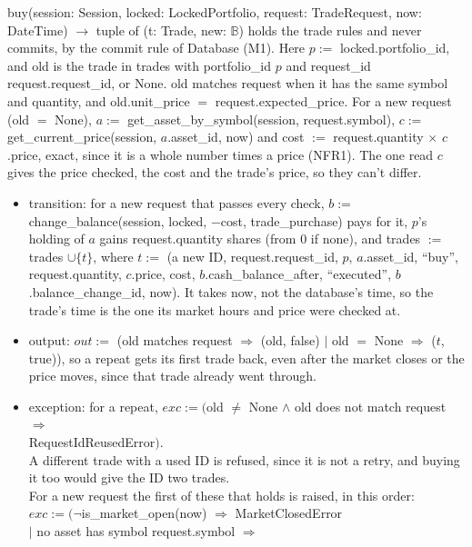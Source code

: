 \documentclass[12pt, titlepage]{article}
\begin{document}
\medskip
\noindent buy(session: Session, locked: LockedPortfolio, request: TradeRequest,
now: DateTime) $\rightarrow$ tuple of (t: Trade, new: $\mathbb{B}$) holds the
trade rules and never commits, by the commit rule of Database (M1). Here
$p :=$ locked.portfolio\_id, and old is the
trade in trades with portfolio\_id $p$ and request\_id request.request\_id, or
None. old matches request when it has the same symbol and quantity, and
old.unit\_price $=$ request.expected\_price. For a new request (old $=$ None),
$a :=$ get\_asset\_by\_symbol(session, request.symbol), $c :=$
get\_current\_price(session, $a$.asset\_id, now) and cost $:=$
request.quantity $\times$ $c$.price, exact, since it is a whole number times a
price (NFR1). The one read $c$ gives the price checked, the cost and the
trade's price, so they can't differ.
\begin{itemize}
\item transition: for a new request that passes every check, $b :=$
  change\_balance(session, locked, $-$cost, trade\_purchase) pays for it, $p$'s
  holding of $a$ gains request.quantity shares (from 0 if none), and trades
  $:=$ trades $\cup \{t\}$, where $t :=$ (a new ID, request.request\_id, $p$,
  $a$.asset\_id, ``buy'', request.quantity, $c$.price, cost,
  $b$.cash\_balance\_after, ``executed'', $b$.balance\_change\_id, now).
  It takes now, not the database's time, so the trade's time is the one its
  market hours and price were checked at.
\item output: $out :=$ (old matches request $\Rightarrow$ (old, false) $\mid$
  old $=$ None $\Rightarrow$ ($t$, true)), so a repeat gets its first trade
  back, even after the market closes or the price moves, since that trade
  already went through.
\item exception: for a repeat, $exc := ($old $\neq$ None $\land$ old does not
  match request $\Rightarrow$\\
  \hspace*{1em}RequestIdReusedError$)$.\\
  A different trade with a used ID is refused, since it is not a retry, and
  buying it too would give the ID two trades.\\
  For a new request the first of these
  that holds is raised, in this order:\\
  \hspace*{1em}$exc := (\neg$is\_market\_open(now) $\Rightarrow$
    MarketClosedError\\
  \hspace*{1em}$\mid$ no asset has symbol request.symbol $\Rightarrow$

\end{itemize}
\end{document}
